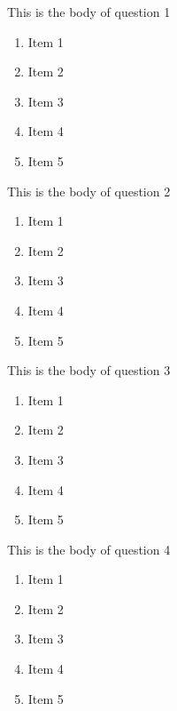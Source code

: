 \documentclass{article}
\begin{document}
This is the body of question 1
\begin{enumerate}
    \item 
    Item 1
    \item
    Item 2
    \item
    Item 3
    \item
    Item 4
    \item
    Item 5
\end{enumerate}




This is the body of question 2
\begin{enumerate}
    \item
    Item 1
    \item
    Item 2
    \item
    Item 3
    \item
    Item 4
    \item
    Item 5
\end{enumerate}


This is the body of question 3
\begin{enumerate}
    \item
    Item 1
    \item
    Item 2
    \item
    Item 3
    \item
    Item 4
    \item
    Item 5
\end{enumerate}



This is the body of question 4
\begin{enumerate}
    \item
    Item 1
    \item
    Item 2
    \item
    Item 3
    \item
    Item 4
    \item
    Item 5
\end{enumerate}
\end{document}
